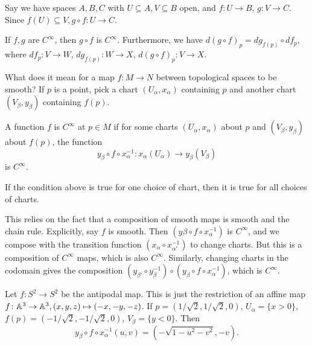 Say we have spaces $A,B,C$ with $U \subseteq A, V \subseteq B$ open, and $f \colon U \to B$, $g \colon V \to C$. Since $f(U) \subseteq V, g \circ f \colon U \to C$.
\begin{theorem}
    If $f,g$ are $C^{\infty}$, then $g \circ f$ is $C^{\infty}$. Furthermore, we have $d( g \circ f) _p = dg _{f(p)}\circ df_p$, where $df_p \colon V \to W$, $dg _{f(p)}\colon W \to X$, $d(g \circ f)_p \colon V \to X$. 
\end{theorem}
What does it mean for a map $f \colon M \to N$ between topological spaces to be smooth? If $p$ is a point, pick a chart $(U_{\alpha }, x_{\alpha })$ containing $p$ and another chart $(V_{\beta }, y _{\beta })$ containing $f(p)$.
\begin{definition}[]
    A function $f$ is $C^{\infty}$ at $p \in M$ if for some charts $(U _{\alpha }, x_{\alpha })$ about $p$ and $(V _{\beta },y _{\beta })$ about $f(p)$, the function \[
        y_{\beta }\circ f \circ x _{\alpha }^{-1} \colon x_{\alpha }(U_{\alpha }) \to y_{\beta }(V_{\beta })
    \] is $C^{\infty}$.
\end{definition}
\begin{lemma}
    If the condition above is true for one choice of chart, then it is true for all choices of charts. 
\end{lemma}
This relies on the fact that a composition of smooth maps is smooth and the chain rule. Explicitly, say $f$ is smooth. Then $(y\beta \circ f \circ x_{\alpha }^{-1})$ is $C^{\infty}$, and we compose with the transition function $(x _{\alpha }\circ x_{\alpha '}^{-1})$ to change charts. But this is a composition of $C^{\infty}$ maps, which is also $C^{\infty}$. Similarly, changing charts in the codomain gives the composition $(y _{\beta' }\circ y _{\beta }^{-1}) \circ (y _{\beta }\circ f \circ x _{\alpha }^{-1})$, which is $C^{\infty}$.
\begin{example}
    Let $f \colon S ^2 \to S ^2$ be the antipodal map. This is just the restriction of an affine map $f \colon \mathbb{A}^3 \to \mathbb{A}^3, (x,y,z)\mapsto (-x,-y,-z)$. If $p=(1 /\sqrt{2} , 1/\sqrt{2} ,0)$, $U_{\alpha }=\{x>0\} $, $f(p)=(-1 /\sqrt{2} , -1 /\sqrt{2} ,0)$, $V_{\beta }=\{y<0\} $. Then \[
        y _{\beta }\circ f \circ x _{\alpha }^{-1} (u,v)= \left( -\sqrt{1-u^2-v^2} , -v \right) .
    \] 
\end{example}


